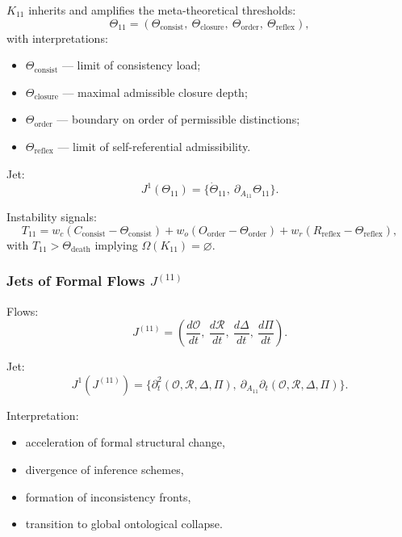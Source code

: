 $K_{11}$ inherits and amplifies the meta-theoretical thresholds:
\[
\Theta_{11}
=
(\Theta_{\mathrm{consist}},\
 \Theta_{\mathrm{closure}},\
 \Theta_{\mathrm{order}},\
 \Theta_{\mathrm{reflex}}),
\]
with interpretations:
\begin{itemize}
    \item $\Theta_{\mathrm{consist}}$ — limit of consistency load;
    \item $\Theta_{\mathrm{closure}}$ — maximal admissible closure depth;
    \item $\Theta_{\mathrm{order}}$ — boundary on order of permissible distinctions;
    \item $\Theta_{\mathrm{reflex}}$ — limit of self-referential admissibility.
\end{itemize}

Jet:
\[
J^1(\Theta_{11})
=
\{\dot{\Theta}_{11},\ \partial_{A_{11}}\Theta_{11}\}.
\]

Instability signals:
\[
T_{11}
=
w_c (C_{\mathrm{consist}}-\Theta_{\mathrm{consist}})
+
w_o (O_{\mathrm{order}}-\Theta_{\mathrm{order}})
+
w_r (R_{\mathrm{reflex}}-\Theta_{\mathrm{reflex}}),
\]
with $T_{11}>\Theta_{\mathrm{death}}$ implying
$\Omega(K_{11})=\varnothing$.


\subsubsection{Jets of Formal Flows $J^{(11)}$}

Flows:
\[
J^{(11)}
=
\left(
\frac{d\mathcal{O}}{dt},\
\frac{d\mathcal{R}}{dt},\
\frac{d\Delta}{dt},\
\frac{d\Pi}{dt}
\right).
\]

Jet:
\[
J^1(J^{(11)})
=
\big\{
\partial_t^2(\mathcal{O},\mathcal{R},\Delta,\Pi),\
\partial_{A_{11}}\partial_t(\mathcal{O},\mathcal{R},\Delta,\Pi)
\big\}.
\]

Interpretation:
\begin{itemize}
    \item acceleration of formal structural change,
    \item divergence of inference schemes,
    \item formation of inconsistency fronts,
    \item transition to global ontological collapse.
\end{itemize}


